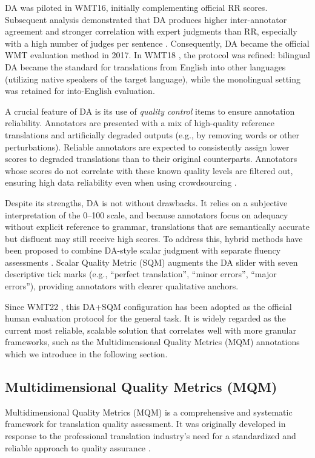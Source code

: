 DA was piloted in WMT16, initially complementing official RR scores. Subsequent analysis demonstrated that DA produces higher inter-annotator agreement and stronger correlation with expert judgments than RR, especially with a high number of judges per sentence \citep{graham-etal-2017-improving}. Consequently, DA became the official WMT evaluation method in 2017. In WMT18 \citep{bojar-etal-2018-findings}, the protocol was refined: bilingual DA became the standard for translations from English into other languages (utilizing native speakers of the target language), while the monolingual setting was retained for into-English evaluation.

A crucial feature of DA is its use of \emph{quality control} items to ensure annotation reliability. Annotators are presented with a mix of high-quality reference translations and artificially degraded outputs (e.g., by removing words or other perturbations). Reliable annotators are expected to consistently assign lower scores to degraded translations than to their original counterparts. Annotators whose scores do not correlate with these known quality levels are filtered out, ensuring high data reliability even when using crowdsourcing \citep{graham_2017}.

Despite its strengths, DA is not without drawbacks. It relies on a subjective interpretation of the 0–100 scale, and because annotators focus on adequacy without explicit reference to grammar, translations that are semantically accurate but disfluent may still receive high scores. To address this, hybrid methods have been proposed to combine DA-style scalar judgment with separate fluency assessments \citep{freitag-etal-2021-experts}. Scalar Quality Metric (SQM) \citep{kocmi-etal-2022-findings} augments the DA slider with seven descriptive tick marks (e.g., ``perfect translation'', ``minor errors'', ``major errors''), providing annotators with clearer qualitative anchors. 

Since WMT22 \citep{kocmi-etal-2022-findings}, this DA+SQM configuration has been adopted as the official human evaluation protocol for the general task. It is widely regarded as the current most reliable, scalable solution that correlates well with more granular frameworks, such as the Multidimensional Quality Metrics (MQM) annotations \citep{freitag-etal-2021-experts} which we introduce in the following section.

\subsection{Multidimensional Quality Metrics (MQM)}
\label{sec:mqm}
Multidimensional Quality Metrics (MQM) \citep{lommel-etal-2014-using} is a comprehensive and systematic framework for translation quality assessment. It was originally developed in response to the professional translation industry’s need for a standardized and reliable approach to quality assurance \citep{burchardt2013multidimensional}.

